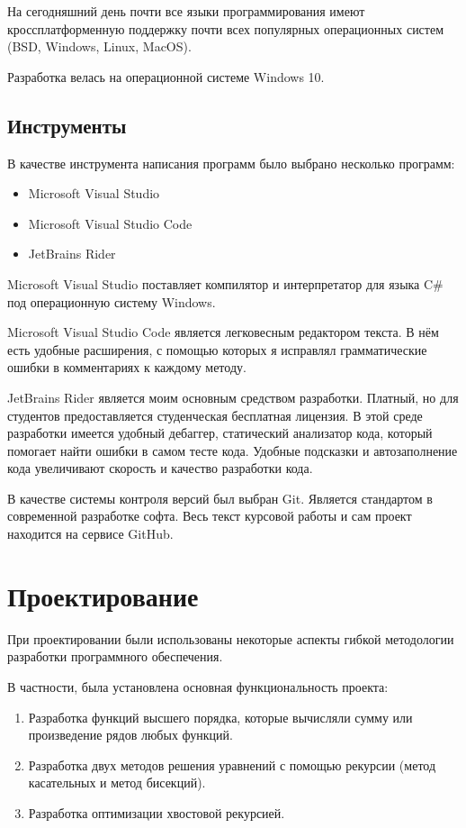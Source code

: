 На сегодняшний день почти все языки программирования имеют кроссплатформенную поддержку почти всех популярных операционных систем (BSD, Windows, Linux, MacOS).

Разработка велась на операционной системе Windows 10.

\subsection{Инструменты}

В качестве инструмента написания программ было выбрано несколько программ:

\begin{itemize}
	\item Microsoft Visual Studio
	\item Microsoft Visual Studio Code
	\item JetBrains Rider
\end{itemize}

Microsoft Visual Studio поставляет компилятор и интерпретатор для языка C\# под операционную систему Windows.

Microsoft Visual Studio Code является легковесным редактором текста.
В нём есть удобные расширения, с помощью которых я исправлял грамматические ошибки в комментариях к каждому методу.

JetBrains Rider является моим основным средством разработки.
Платный, но для студентов предоставляется студенческая бесплатная лицензия.
В этой среде разработки имеется удобный дебаггер, статический анализатор кода, который помогает найти ошибки в самом тесте кода.
Удобные подсказки и автозаполнение кода увеличивают скорость и качество разработки кода.

В качестве системы контроля версий был выбран Git.
Является стандартом в современной разработке софта.
Весь текст курсовой работы и сам проект находится на сервисе GitHub\cite{GitHub}.

\newpage
\section{Проектирование}

При проектировании были использованы некоторые аспекты гибкой методологии разработки программного обеспечения.

В частности, была установлена основная функциональность проекта:

\begin{enumerate}
	\item Разработка функций высшего порядка, которые вычисляли сумму или произведение рядов любых функций.
	\item Разработка двух методов решения уравнений с помощью рекурсии (метод касательных и метод бисекций).
	\item Разработка оптимизации хвостовой рекурсией.
\end{enumerate}

